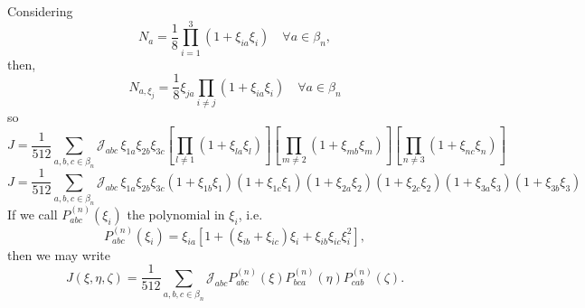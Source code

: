 \documentclass[11pt]{article} %
\begin{document}
Considering
\begin{equation}
	N_a = \frac{1}{8} \prod_{i=1}^3 (1 + \xi_{ia} \xi_i) \quad \forall a \in \beta_n,
\end{equation}
then,
\begin{equation}
	N_{a,\xi_j} = \frac{1}{8} \xi_{ja} \prod_{i \neq j} (1 + \xi_{ia} \xi_i) \quad \forall a \in \beta_n
\end{equation}
so
\begin{equation}
	J = \frac{1}{512} \sum_{a,b,c \in \beta_n} \mathcal{J}_{abc} \, \xi_{1a} \xi_{2b} \xi_{3c} \left[ \prod_{l \neq 1} (1 + \xi_{la} \xi_l) \right] \left[ \prod_{m \neq 2} (1 + \xi_{mb} \xi_m) \right] \left[ \prod_{n \neq 3} (1 + \xi_{nc} \xi_n)\right]
\end{equation}
\begin{equation}
	J = \frac{1}{512} \sum_{a,b,c \in \beta_n} \mathcal{J}_{abc} \, \xi_{1a} \xi_{2b} \xi_{3c} (1 + \xi_{1b} \xi_1) (1 + \xi_{1c} \xi_1) (1 + \xi_{2a} \xi_2) (1 + \xi_{2c} \xi_2)  (1 + \xi_{3a} \xi_3) (1 + \xi_{3b} \xi_3)  
\end{equation}
If we call $P^{(n)}_{abc} (\xi_i)$ the polynomial in $\xi_i$, i.e.
\begin{equation}
	P^{(n)}_{abc} (\xi_i) = \xi_{ia} \left[1 + (\xi_{ib} + \xi_{ic}) \xi_i + \xi_{ib} \xi_{ic} \xi_i^2 \right],
\end{equation}
then we may write
\begin{equation}
	J (\xi, \eta, \zeta) = \frac{1}{512} \sum_{a,b,c \in \beta_n} \mathcal{J}_{abc} P^{(n)}_{abc} (\xi) P^{(n)}_{bca} (\eta) P^{(n)}_{cab} (\zeta).
\end{equation}
\end{document}
